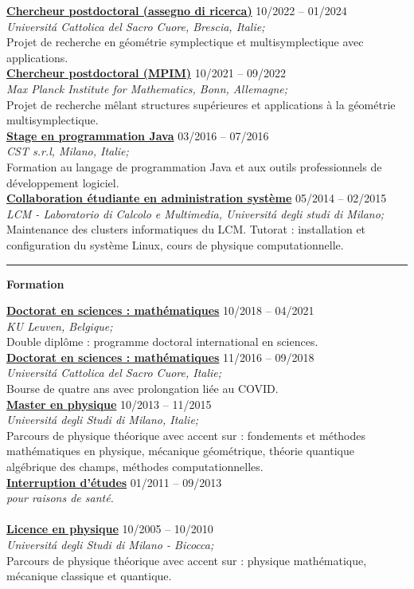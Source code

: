 \documentclass[a4paper]{article}
\newcommand{\block}[1]{\hrule \vspace{0.2cm} \textbf{\Large #1} \vspace{0.2cm}}
\newcommand{\voice}[5]{\href{#4}{\textbf{#1}} \hfill #2 \\ \textit{#3} \\ {\small #5} \vspace{0.2cm} \\}
\begin{document}
	\voice{Chercheur postdoctoral (assegno di ricerca)}
		{10/2022 -- 01/2024}
		{Universit\'a Cattolica del Sacro Cuore, Brescia, Italie;}
		{https://dipartimenti.unicatt.it/dmf-home}
		{Projet de recherche en géométrie symplectique et multisymplectique avec applications.}
	\voice{Chercheur postdoctoral (MPIM)}
		{10/2021 -- 09/2022}
		{Max Planck Institute for Mathematics, Bonn, Allemagne;}
		{https://www.mpim-bonn.mpg.de/}
		{Projet de recherche mêlant structures supérieures et applications à la géométrie multisymplectique.}
	\voice{Stage en programmation Java}
		{03/2016 -- 07/2016}
		{CST s.r.l, Milano, Italie;}
		{https://www.csttech.it/}
		{Formation au langage de programmation Java et aux outils professionnels de développement logiciel.}
	\voice{Collaboration étudiante en administration système}
		{05/2014 -- 02/2015}
		{LCM - Laboratorio di Calcolo e Multimedia, Universit\'a degli studi di Milano;}
		{https://lcm.mi.infn.it/}
		{Maintenance des clusters informatiques du LCM. Tutorat : installation et configuration du système Linux, cours de physique computationnelle.\vspace{-0.25cm}}

	\block{Formation}

	\voice{Doctorat en sciences : mathématiques}
		{10/2018 -- 04/2021}
		{KU Leuven, Belgique;}
		{https://web.archive.org/save/http://scuoledidottorato.unicatt.it/phdschools/science-research-projects}
		{Double diplôme : programme doctoral international en sciences.}
	\voice{Doctorat en sciences : mathématiques}
		{11/2016 -- 09/2018}
		{Universit\'a Cattolica del Sacro Cuore, Italie;}
		{https://web.archive.org/save/http://scuoledidottorato.unicatt.it/phdschools/science-research-projects}
		{Bourse de quatre ans avec prolongation liée au COVID.}
	\voice{Master en physique}
		{10/2013 -- 11/2015}
		{Universit\'a degli Studi di Milano, Italie;}
		{https://www.unimi.it/en/education/master-programme/physics-master-programme}
		{Parcours de physique théorique avec accent sur : fondements et méthodes mathématiques en physique, mécanique géométrique, théorie quantique algébrique des champs, méthodes computationnelles.}
	\voice{Interruption d'études}
		{01/2011 -- 09/2013}
		{pour raisons de santé.}
		{}
		{\vspace{-0.25cm}}
	\voice{Licence en physique}
		{10/2005 -- 10/2010}
		{Universit\'a degli Studi di Milano - Bicocca;}
		{https://www.fisica.unimib.it/en/teaching/degree-courses/bachelor-three-year-laurea-physics}
		{Parcours de physique théorique avec accent sur : physique mathématique, mécanique classique et quantique.}
\end{document}

